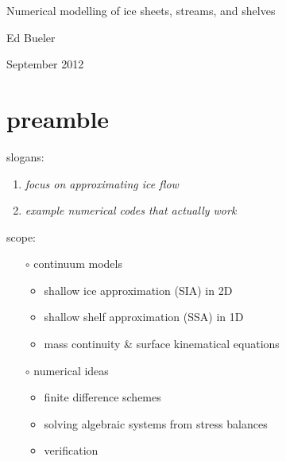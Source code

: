 \documentclass[titlepage,letterpaper,final,11pt]{scrartcl}
\newcommand{\alert}[1]{\emph{#1}}
\begin{document}
\graphicspath{{../photos/}{../pdffigs/}}


\begin{titlepage}

  \begin{center}
    {\Large{} Numerical modelling of ice sheets, streams, and shelves}
    \vspace{0.5cm}

    {\large Ed Bueler}
    \vspace{1cm}

    September 2012
  \end{center}
\end{titlepage}


\section{preamble}

slogans:
  \begin{enumerate}
  \item \alert{focus on approximating ice flow}
  \item \alert{example numerical codes that actually work}
  \end{enumerate}
\medskip

scope:
  \begin{itemize}
  \item[$\circ$] continuum models

    \begin{itemize}
    \item shallow ice approximation (SIA) in 2D
    \item shallow shelf approximation (SSA) in 1D
    \item mass continuity \& surface kinematical equations
    \end{itemize}

  \item[$\circ$] numerical ideas

    \begin{itemize}
    \item finite difference schemes
    \item solving algebraic systems from stress balances
    \item verification
    \end{itemize}
  \end{itemize}
\end{document}
